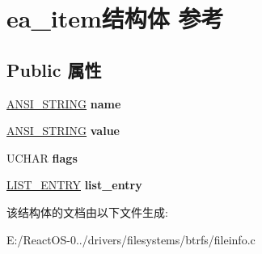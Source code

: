 \hypertarget{structea__item}{}\section{ea\+\_\+item结构体 参考}
\label{structea__item}
\subsection*{Public 属性}
\begin{DoxyCompactItemize}
\item 
\mbox{\label{structea__item_ab730b6a8682eb854af05250ddeadead6}} 
\hyperlink{struct___a_n_s_i___s_t_r_i_n_g}{A\+N\+S\+I\+\_\+\+S\+T\+R\+I\+NG} {\bfseries name}
\item 
\mbox{\label{structea__item_a0c6e08ac6fd7d398ebf777606060ad63}} 
\hyperlink{struct___a_n_s_i___s_t_r_i_n_g}{A\+N\+S\+I\+\_\+\+S\+T\+R\+I\+NG} {\bfseries value}
\item 
\mbox{\label{structea__item_a912d99700591e111f387da8be46f56a3}} 
U\+C\+H\+AR {\bfseries flags}
\item 
\mbox{\label{structea__item_a1cb8afb97183904e2b99532f55adb922}} 
\hyperlink{struct___l_i_s_t___e_n_t_r_y}{L\+I\+S\+T\+\_\+\+E\+N\+T\+RY} {\bfseries list\+\_\+entry}
\end{DoxyCompactItemize}


该结构体的文档由以下文件生成\+:\begin{DoxyCompactItemize}
\item 
E\+:/\+React\+O\+S-\/0../drivers/filesystems/btrfs/fileinfo.\+c\end{DoxyCompactItemize}
